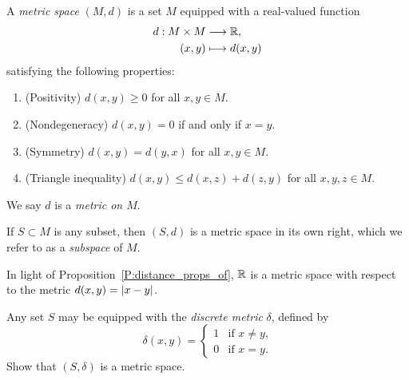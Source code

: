 \documentclass{book}
\begin{document}
\begin{defn}
A {\em metric space} $(M,d)$ is a set $M$ equipped with a real-valued function
\[
\begin{aligned}
	d : M \times M &\longrightarrow \mathbb{R},
	\\ (x,y) &\longmapsto d(x,y)
\end{aligned}
\]
satisfying the following properties:
\begin{enumerate}
\item (Positivity) $d(x,y) \geq 0$ for all $x,y \in M$.
\label{I:metric_pos}
\item (Nondegeneracy) $d(x,y) = 0$ if and only if $x = y$.
\label{I:metric_nondegen}
\item (Symmetry) $d(x,y) = d(y,x)$ for all $x, y \in M$.
\label{I:metric_symm}
\item (Triangle inequality) $d(x,y) \leq d(x,z) + d(z, y)$ for all $x,y,z \in M$.
\label{I:metric_triangle}
\end{enumerate}
We say $d$ is a {\em metric on $M$}.

If $S\subset M$ is any subset, then $(S,d)$ is a metric space in its own right,
which we refer to as a {\em subspace} of $M$. 
\label{D:metric}
\end{defn}

\begin{ex}
In light of Proposition~\ref{P:distance_props_of}, $\mathbb{R}$ is a metric space with respect to the metric $d(x,y) = \lvert x - y\rvert$.
\label{X:R_metric}
\end{ex}

\begin{exstar}
Any set $S$ may be equipped with the {\em discrete metric} $\delta$, defined by
\[
	\delta(x,y) = \begin{cases} 1 & \text{if $x \neq y$,} \\ 0 & \text{if $x = y$.} \end{cases}
\]
Show that $(S,\delta)$ is a metric space.
\label{X:discrete}
\end{exstar}
\end{document}
